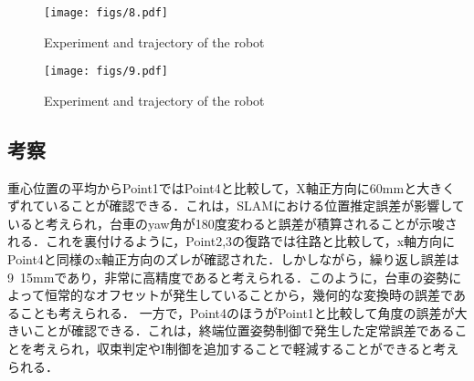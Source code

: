 \begin{figure}[h]
\texttt{[image: figs/8.pdf]}
\caption{Experiment and trajectory of the robot}
\label{fig:fig8}
\end{figure}

\begin{figure}[h]
\texttt{[image: figs/9.pdf]}
\caption{Experiment and trajectory of the robot}
\label{fig:fig9}
\end{figure}

\subsection{考察}
重心位置の平均からPoint1ではPoint4と比較して，X軸正方向に60mmと大きくずれていることが確認できる．これは，SLAMにおける位置推定誤差が影響していると考えられ，台車のyaw角が180度変わると誤差が積算されることが示唆される．これを裏付けるように，Point2,3の復路では往路と比較して，x軸方向にPoint4と同様のx軸正方向のズレが確認された．しかしながら，繰り返し誤差は9~15mmであり，非常に高精度であると考えられる．このように，台車の姿勢によって恒常的なオフセットが発生していることから，幾何的な変換時の誤差であることも考えられる．
一方で，Point4のほうがPoint1と比較して角度の誤差が大きいことが確認できる．これは，終端位置姿勢制御で発生した定常誤差であることを考えられ，収束判定やI制御を追加することで軽減することができると考えられる．
